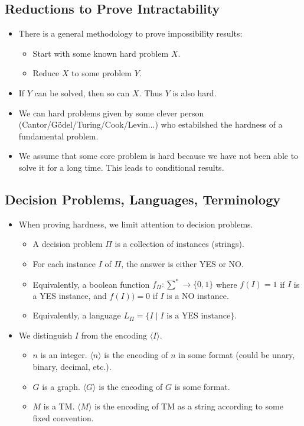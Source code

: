 \documentclass[12pt]{article}
\begin{document}
\subsection{Reductions to Prove Intractability}
\begin{itemize}
    \item There is a general methodology to prove impossibility results:
    \begin{itemize}
        \item Start with some known hard problem $X$.
        \item Reduce $X$ to some problem $Y$.
    \end{itemize}
    \item If $Y$ can be solved, then so can $X$. Thus $Y$ is also hard.
    \item We can hard problems given by some clever person (Cantor/Gödel/Turing/Cook/Levin...) who estabilshed the hardness of a fundamental problem.
    \item We assume that some core problem is hard because we have not been able to solve it for a long time. This leads to conditional results.
\end{itemize}

\subsection{Decision Problems, Languages, Terminology}
\begin{itemize}
    \item When proving hardness, we limit attention to decision problems.
    \begin{itemize}
        \item A decision problem $\Pi$ is a collection of instances (strings).
        \item For each instance $I$ of $\Pi$, the answer is either YES or NO.
        \item Equivalently, a boolean function $f_\Pi: \sum^\ast \rightarrow \{ 0, 1 \}$ where $f(I) = 1$ if $I$ is a YES instance, and $f(I)) = 0$ if $I$ is a NO instance.
        \item Equivalently, a language $L_\Pi = \{ I \mid \text{$I$ is a YES instance} \}$.
    \end{itemize}
    \item We distinguish $I$ from the encoding $\langle I \rangle$.
    \begin{itemize}
        \item $n$ is an integer. $\langle n \rangle$ is the encoding of $n$ in some format (could be unary, binary, decimal, etc.).
        \item $G$ is a graph. $\langle G \rangle$ is the encoding of $G$ is some format.
        \item $M$ is a TM. $\langle M \rangle$ is the encoding of TM as a string according to some fixed convention.
    \end{itemize}
\end{itemize}
\end{document}
